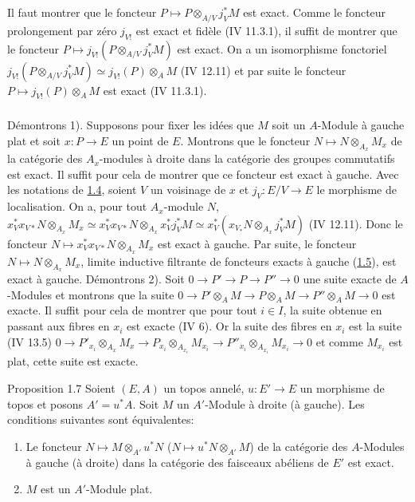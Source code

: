 \documentclass[10pt]{../fichiers-configuration-latex/smfart}
\begin{document}
Il faut montrer que le foncteur $P \mapsto P \otimes_{A/V}
j^{\ast}_V M$ est exact. Comme le foncteur prolongement par zéro
$j_{V!}$ est exact et fidèle (IV 11.3.1), il suffit de montrer que
le foncteur $P \mapsto j_{V!} (P \otimes_{A/V} j^{\ast}_V M)$ est
exact. On a un isomorphisme fonctoriel \pageoriginale $j_{V!} (P
\otimes_{A/V} j^{\ast}_V M) \simeq j_{V!} (P) \otimes_A M$ (IV
12.11) et par suite le foncteur $P \mapsto j_{V!} (P) \otimes_A M$
est exact (IV 11.3.1).

\setcounter{subsection}{6}
\setcounter{subsubsection}{1}
\subsubsection{}
Démontrons 1).
Supposons pour fixer les idées que $M$ soit un $A$-Module à
  gauche plat et soit $x : P \to E$ un point de $E$. Montrons que
  le foncteur $N \mapsto N\otimes_{A_x} M_x$ de la catégorie des
  $A_x$-modules à droite dans la catégorie des groupes commutatifs
  est exact. Il suffit pour cela de montrer que ce foncteur est exact
  à gauche. Avec les notations de \hyperref[V.subsec1.4]{1.4}, soient $V$ un voisinage de
  $x$ et $j_V: E/V \to E$ le morphisme de localisation. On a, pour
  tout $A_x$-module $N$, $x^\ast_V x_{V\ast} N \otimes_{A_x} M_x
  \simeq x^{\ast} _V x_{V\ast} N \otimes _{A_x}
  x^\ast_{V}j^{\ast}_V M \simeq x^\ast_V (x_{V_\ast} N \otimes_{A_x}
  j^\ast_V M)$ (IV 12.11). Donc le foncteur $N \mapsto x^\ast_V
  x_{V\ast} N \otimes_{A_x} M_x$ est exact à gauche. Par suite, le
  foncteur $N \mapsto N \otimes_{A_x} M_x$, limite inductive filtrante
  de foncteurs exacts à gauche (\hyperref[V.prop1.5]{1.5}), est exact à gauche.
Démontrons 2). Soit $0 \to P' \to P \to P'' \to 0$ une suite exacte
de $A$-Modules et montrons que la suite $0 \to P' \otimes_A M \to P
\otimes_A M \to P'' \otimes_A M \to 0$ est exacte. Il suffit pour cela
de montrer que pour tout $i \in I$, la suite obtenue en passant aux
fibres en $x_i$ est exacte (IV 6). Or la suite des fibres en $x_i$ est
la suite (IV 13.5)
$0 \to P'_{x_i} \otimes_{A_x} M_x \to P_{x_i} \otimes_{A_{x_i}} M_{x_i}
\to P''_{x_i} \otimes_{A_{x_i}} M_{x_i} \to 0$ et comme $M_{x_i}$ est
plat, cette suite est exacte.

\begin{enonce*}{Proposition 1.7}
Soient $(E, A)$ un topos annelé, $u : E' \to E$ un morphisme de
topos et posons $A' = u^{\ast} A$. Soit $M$ un $A'$-Module à droite
(\resp à gauche). Les conditions suivantes sont équivalentes:
\begin{enumerate}
\renewcommand{\theenumi}{\roman{enumi}}
\renewcommand{\labelenumi}{\theenumi)}
\item Le foncteur $N \mapsto M \otimes_{A'} u^{\ast} N$ (\resp $N
  \mapsto u^{\ast} N \otimes_{A'} M$) de la catégorie des $A$-Modules
  à gauche (\resp à droite) dans la catégorie des faisceaux
  abéliens de $E'$ est exact.
\item $M$ est un $A'$-Module plat.
\end{enumerate}
\end{enonce*}
\end{document}
